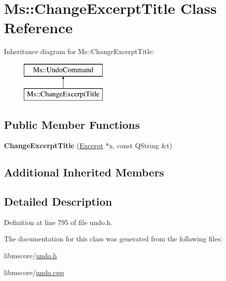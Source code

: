 \hypertarget{class_ms_1_1_change_excerpt_title}{}\section{Ms\+:\+:Change\+Excerpt\+Title Class Reference}
\label{class_ms_1_1_change_excerpt_title}
Inheritance diagram for Ms\+:\+:Change\+Excerpt\+Title\+:\begin{figure}[H]
\begin{center}
\leavevmode
\includegraphics[height=2.000000cm]{class_ms_1_1_change_excerpt_title}
\end{center}
\end{figure}
\subsection*{Public Member Functions}
\begin{DoxyCompactItemize}
\item 
\mbox{\label{class_ms_1_1_change_excerpt_title_a5f550d3b8c56e72640431532f60a8a54}} 
{\bfseries Change\+Excerpt\+Title} (\hyperlink{class_ms_1_1_excerpt}{Excerpt} $\ast$x, const Q\+String \&t)
\end{DoxyCompactItemize}
\subsection*{Additional Inherited Members}


\subsection{Detailed Description}


Definition at line 795 of file undo.\+h.



The documentation for this class was generated from the following files\+:\begin{DoxyCompactItemize}
\item 
libmscore/\hyperlink{undo_8h}{undo.\+h}\item 
libmscore/\hyperlink{undo_8cpp}{undo.\+cpp}\end{DoxyCompactItemize}
